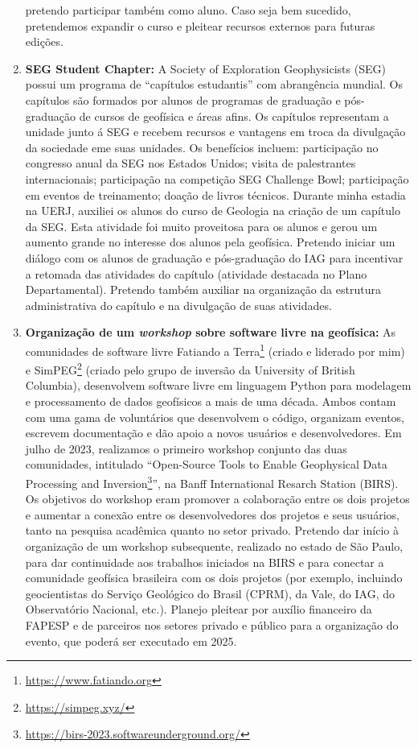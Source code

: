 \documentclass[12pt,a4paper,oneside]{book}
\begin{document}
\begin{enumerate}
    pretendo participar também como aluno. Caso seja bem sucedido, pretendemos
    expandir o curso e pleitear recursos externos para futuras edições.
  \item \textbf{SEG Student Chapter:} A Society of Exploration Geophysicists
    (SEG) possui um programa de ``capítulos estudantis'' com abrangência
    mundial. Os capítulos são formados por alunos de programas de graduação e
    pós-graduação de cursos de geofísica e áreas afins. Os capítulos
    representam a unidade junto á SEG e recebem recursos e vantagens em troca
    da divulgação da sociedade eme suas unidades. Os benefícios incluem:
    participação no congresso anual da SEG nos Estados Unidos; visita de
    palestrantes internacionais; participação na competição SEG Challenge Bowl;
    participação em eventos de treinamento; doação de livros técnicos. Durante
    minha estadia na UERJ, auxiliei os alunos do curso de Geologia na criação
    de um capítulo da SEG. Esta atividade foi muito proveitosa para os alunos
    e gerou um aumento grande no interesse dos alunos pela geofísica. Pretendo
    iniciar um diálogo com os alunos de graduação e pós-graduação do IAG para
    incentivar a retomada das atividades do capítulo (atividade destacada no
    Plano Departamental). Pretendo também auxiliar na organização da estrutura
    administrativa do capítulo e na divulgação de suas atividades.
  \item \textbf{Organização de um \emph{workshop} sobre software livre na
    geofísica:}
    As comunidades de software livre Fatiando a
    Terra\footnote{\url{https://www.fatiando.org}} (criado e liderado por mim)
    e SimPEG\footnote{\url{https://simpeg.xyz/}}
    (criado pelo grupo de inversão da University of British Columbia),
    desenvolvem software livre em linguagem Python para modelagem e
    processamento de dados geofísicos a mais de uma década. Ambos contam com uma
    gama de voluntários que desenvolvem o código, organizam eventos, escrevem
    documentação e dão apoio a novos usuários e desenvolvedores.
    Em julho de 2023, realizamos o primeiro workshop conjunto das duas
    comunidades, intitulado
    ``Open-Source Tools to Enable Geophysical Data Processing and
    Inversion\footnote{\url{https://birs-2023.softwareunderground.org/}}'', na
    Banff International Resarch Station (BIRS). Os objetivos do workshop eram
    promover a colaboração entre os dois projetos e aumentar a conexão entre os
    desenvolvedores dos projetos e seus usuários, tanto na pesquisa acadêmica
    quanto no setor privado. Pretendo dar início à organização de um workshop
    subsequente, realizado no estado de São Paulo, para dar continuidade aos
    trabalhos iniciados na BIRS e para conectar a comunidade geofísica
    brasileira com os dois projetos (por exemplo, incluindo geocientistas do
    Serviço Geológico do Brasil (CPRM), da Vale, do IAG, do Observatório
    Nacional, etc.). Planejo pleitear por auxílio financeiro da FAPESP e de
    parceiros nos setores privado e público para a organização do evento, que
    poderá ser executado em 2025.
\end{enumerate}
\end{document}
